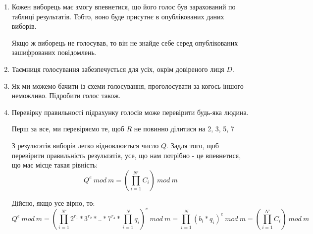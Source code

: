 \begin{enumerate}
    \item Кожен виборець має змогу впевнетися, що його голос був зарахований по таблиці результатів.
    Тобто, воно буде присутнє в опублікованих даних виборів.

    Якщо ж виборець не голосував, то він не знайде себе серед опублікованих зашифрованих повідомлень.
    
    \item Таємниця голосування забезпечується для усіх, окрім довіреного лиця $D$.

    \item Як ми можемо бачити із схеми голосування, проголосувати за когось іншого неможливо. Підробити
    голос також.

    \item Перевірку правильності підрахунку голосів може перевірити будь-яка людина.

    Перш за все, ми перевіряємо те, щоб $R$ не повинно ділитися на 2, 3, 5, 7 

    З результатів виборів легко відновлюється число $Q$. Задля того, щоб перевірити правильність
    результатів, усе, що нам потрібно - це впевнетися, що має місце такая рівність:
    \[ Q^e \ mod \ m = (\prod_{i=1}^{N'} C_i) \ mod \ m\]

    Дійсно, якщо усе вірно, то:
    \[ Q^e \ mod \ m = (\prod_{i=1}^{N'} 2^{r_1} * 3^{r_2} * .. * 7 ^{r_4} * \prod_{i=1}^N q_i)^e 
    \ mod \ m  = \prod_{i=1}^N (b_i*q_i)^e\ mod\ m = (\prod_{i=1}^{N'} C_i) \ mod \ m\]

\end{enumerate}